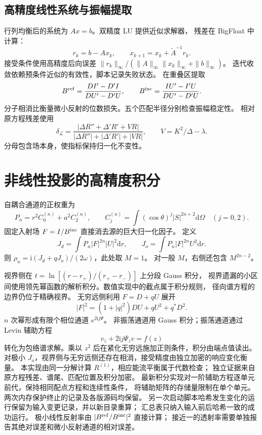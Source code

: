 \documentclass[UTF8,fontset=fandol,11pt,a4paper]{ctexart}
\newcommand{\ii}{\mathrm{i}}\newcommand{\dd}{\mathrm{d}}
\numberwithin{equation}{section}
\begin{document}
\subsection{高精度线性系统与振幅提取}
行列均衡后的系统为 $Ax=b$。双精度 LU 提供近似求解器，
残差在 BigFloat 中计算：
\begin{equation}
r_k=b-Ax_k,\qquad x_{k+1}=x_k+\widetilde A^{-1}r_k.
\end{equation}
接受条件使用高精度后向误差
$\|r_k\|_\infty/(\|A\|_\infty\|x_k\|_\infty+\|b\|_\infty)$。
迭代收敛依赖预条件近似的有效性，脚本记录失败状态。
在重叠区提取
\begin{equation}
B^{\rm ref}=\frac{DI'-D'I}{DU'-D'U},\qquad
B^{\rm inc}=\frac{IU'-I'U}{DU'-D'U}.
\end{equation}
分子相消比衡量微小反射的位数损失。五个匹配半径分别检查振幅稳定性。
相对原方程残差使用
\begin{equation}
\delta_{\mathcal L}=\frac{|\Delta R''+\Delta'R'+VR|}
{|\Delta R''|+|\Delta'R'|+|VR|},\qquad V=K^2/\Delta-\lambda.
\end{equation}
分母包含场本身，使指标保持归一化不变性。

\section{非线性投影的高精度积分}
自耦合通道的正权重为
\begin{equation}
P_n=r^2C_0^{(n)}+a^2C_2^{(n)},\qquad
C_j^{(n)}=\int (\cos\theta)^j|S|^{2n+2}\dd\Omega\quad(j=0,2).
\end{equation}
固定入射场 $F=I/B^{\rm inc}$ 直接消去源的巨大归一化因子。
定义
\begin{equation}
J_d=\int P_n|F|^{2n}|U|^2\dd r,\qquad
J_o=\int P_n|F|^{2n}U^2\dd r.
\end{equation}
则 $\rho_n=\ii(J_d+qJ_o)/(2\omega)$，此处取 $M=1$。
对一般 $M$，右侧还包含 $M^{2n-2}$。

视界侧在 $t=\ln[(r-r_+)/(r_+-r_-)]$ 上分段 Gauss 积分，
视界遗漏的小区间使用领先幂函数的解析积分。数值实现中的截点属于积分规则，
径向谱方程的边界仍位于精确视界。
无穷远侧利用 $F=D+qU$ 展开
\begin{equation}
|F|^2=(1+|q|^2)DU+qU^2+q^*D^2.
\end{equation}
$n$ 次幂形成有限个相位通道 $e^{2\ii j\Psi}$。
非振荡通道用 Gauss 积分；振荡通道通过 Levin 辅助方程
\begin{equation}
v_z+2\ii j\Psi_z v=f(z)
\end{equation}
转化为包络谱求解。乘以 $z^2$ 后在紧化无穷远施加正则条件，积分由端点值读出。
对极小 $J_o$，视界侧与无穷远侧还存在相消，接受精度由独立加密的响应变化衡量。
本实现由同一分解计算 $R^{(1)}$，相应能流平衡属于代数检查；
独立证据来自原方程残差、谱尾、匹配位置及积分加密。
最新积分实现对一阶辅助方程逐单元前代，保持相同配点方程和连续性条件，
将辅助矩阵的存储量限制在单个单元。两次内存保护终止的记录及各版源码均保留。
另一次启动脚本哈希发生变化的运行保留为输入变更记录，并以新目录重算；
汇总表只纳入输入前后哈希一致的成功运行。
极小线性反射率由 $|B^{\rm ref}/B^{\rm inc}|^2$ 直接计算；
接近一的透射率需要单独报告其绝对误差和微小反射通道的相对误差。
\end{document}
